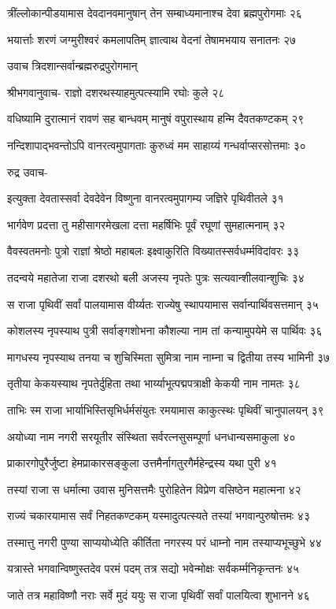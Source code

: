त्रींल्लोकान्पीडयामास देवदानवमानुषान्
तेन सम्बाध्यमानाश्च देवा ब्रह्मपुरोगमाः २६

भयार्त्ताः शरणं जग्मुरीश्वरं कमलापतिम्
ज्ञात्वाथ वेदनां तेषामभयाय सनातनः २७

उवाच त्रिदशान्सर्वान्ब्रह्मरुद्रपुरोगमान्

श्रीभगवानुवाच-
राज्ञो दशरथस्याहमुत्पत्स्यामि रघोः कुले २८

वधिष्यामि दुरात्मानं रावणं सह बान्धवम्
मानुषं वपुरास्थाय हन्मि दैवतकण्टकम् २९

नन्दिशापाद्भवन्तोऽपि वानरत्वमुपागताः
कुरुध्वं मम साहाय्यं गन्धर्वाप्सरसोत्तमाः ३०

रुद्र उवाच-

इत्युक्ता देवतास्सर्वा देवदेवेन विष्णुना
वानरत्वमुपागम्य जज्ञिरे पृथिवीतले ३१

भार्गवेण प्रदत्ता तु महीसागरमेखला
दत्ता महर्षिभिः पूर्वं रघूणां सुमहात्मनाम् ३२

वैवस्वतमनोः पुत्रो राज्ञां श्रेष्ठो महाबलः
इक्ष्वाकुरिति विख्यातस्सर्वधर्म्मविदांवरः ३३

तदन्वये महातेजा राजा दशरथो बली
अजस्य नृपतेः पुत्रः सत्यवान्शीलवान्शुचिः ३४

स राजा पृथिवीं सर्वां पालयामास वीर्य्यतः
राज्येषु स्थापयामास सर्वान्पार्थिवसत्तमान् ३५

कोशलस्य नृपस्याथ पुत्री सर्वाङ्गशोभना
कौशल्या नाम तां कन्यामुपयेमे स पार्थिवः ३६

मागधस्य नृपस्याथ तनया च शुचिस्मिता
सुमित्रा नाम नाम्ना च द्वितीया तस्य भामिनी ३७

तृतीया केकयस्याथ नृपतेर्दुहिता तथा
भार्य्याभूत्पद्मपत्राक्षी केकयी नाम नामतः ३८

ताभिः स्म राजा भार्याभिस्तिसृभिर्धर्मसंयुतः
रमयामास काकुत्स्थः पृथिवीं चानुपालयन् ३९

अयोध्या नाम नगरी सरयूतीर संस्थिता
सर्वरत्नसुसम्पूर्णा धनधान्यसमाकुला ४०

प्राकारगोपुरैर्जुष्टा हेमप्राकारसङ्कुला
उत्तमैर्नागतुरगैर्महेन्द्रस्य यथा पुरी ४१

तस्यां राजा स धर्मात्मा उवास मुनिसत्तमैः
पुरोहितेन विप्रेण वसिष्ठेन महात्मना ४२

राज्यं चकारयामास सर्वं निहतकण्टकम्
यस्मादुत्पत्स्यते तस्यां भगवान्पुरुषोत्तमः ४३

तस्मात्तु नगरी पुण्या साप्ययोध्येति कीर्तिता
नगरस्य परं धाम्नो नाम तस्याप्यभूच्छुभे ४४

यत्रास्ते भगवान्विष्णुस्तदेव परमं पदम्
तत्र सद्यो भवेन्मोक्षः सर्वकर्म्मनिकृन्तनः ४५

जाते तत्र महाविष्णौ नराः सर्वे मुदं ययुः
स राजा पृथिवीं सर्वां पालयित्वा शुभानने ४६

